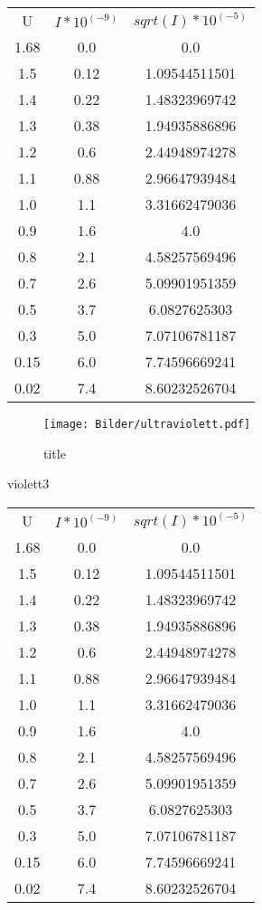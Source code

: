 \begin{table}
\begin{tabular}{ccc}
U & $I*10^(-9)$ & $sqrt(I)*10^(-5)$ \\
1.68 & 0.0 & 0.0 \\
1.5 & 0.12 & 1.09544511501 \\
1.4 & 0.22 & 1.48323969742 \\
1.3 & 0.38 & 1.94935886896 \\
1.2 & 0.6 & 2.44948974278 \\
1.1 & 0.88 & 2.96647939484 \\
1.0 & 1.1 & 3.31662479036 \\
0.9 & 1.6 & 4.0 \\
0.8 & 2.1 & 4.58257569496 \\
0.7 & 2.6 & 5.09901951359 \\
0.5 & 3.7 & 6.0827625303 \\
0.3 & 5.0 & 7.07106781187 \\
0.15 & 6.0 & 7.74596669241 \\
0.02 & 7.4 & 8.60232526704 \\
\end{tabular}
\end{table}



\begin{figure}
  \centering
  \caption{title}
  \label{fig:jakdeffn}
  \texttt{[image: Bilder/ultraviolett.pdf]}
\end{figure}



violett3

\begin{table}
\begin{tabular}{ccc}
U & $I*10^(-9)$ & $sqrt(I)*10^(-5)$ \\
1.68 & 0.0 & 0.0 \\
1.5 & 0.12 & 1.09544511501 \\
1.4 & 0.22 & 1.48323969742 \\
1.3 & 0.38 & 1.94935886896 \\
1.2 & 0.6 & 2.44948974278 \\
1.1 & 0.88 & 2.96647939484 \\
1.0 & 1.1 & 3.31662479036 \\
0.9 & 1.6 & 4.0 \\
0.8 & 2.1 & 4.58257569496 \\
0.7 & 2.6 & 5.09901951359 \\
0.5 & 3.7 & 6.0827625303 \\
0.3 & 5.0 & 7.07106781187 \\
0.15 & 6.0 & 7.74596669241 \\
0.02 & 7.4 & 8.60232526704 \\
\end{tabular}
\end{table}


